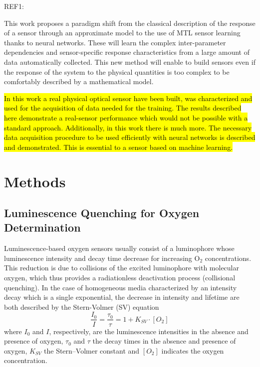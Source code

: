 \documentclass[final,5p,times,twocolumn]{elsarticle}
\begin{document}
REF1: \cite{Michelucci2019_2}

This work proposes a paradigm shift from the classical description of the response of a sensor through an approximate model to the use of MTL sensor learning thanks to neural networks. 
These will learn the complex inter-parameter dependencies and sensor-specific response characteristics from a large amount of data automatically collected. This new method will enable to build sensors even if the response of the system to the physical quantities is too complex to be comfortably described by a mathematical model.

\hl{In this work a real physical optical sensor have been built, was characterized and used for the acquisition of data needed for the training. The results described here demonstrate a real-sensor performance which would not be possible with a standard approach. Additionally, in this work there is much more. The necessary data acquisition procedure to be used efficiently with neural networks is described and demonstrated. This is essential to a sensor based on machine learning.
}

\section{Methods}
\label{sec:methods}

\subsection{Luminescence Quenching for Oxygen Determination}
\label{Theory}

Luminescence-based oxygen sensors usually consist of a luminophore whose luminescence intensity and decay time decrease for increasing O$_2$ concentrations. This reduction is due to collisions of the excited luminophore with molecular oxygen, which thus provides a radiationless deactivation process (collisional quenching). 
In the case of homogeneous media characterized by an intensity decay which is a single exponential, the decrease in intensity and lifetime are both described by the Stern-Volmer (SV) equation \cite{Lakowicz2006}
\begin{equation}
\frac{I_0}{I}=\frac{\tau_0}{\tau}=1+K_{SV} \cdot \left[O_2\right]
\label{SVe}
\end{equation}
where $I_0$ and $I$, respectively, are the luminescence intensities in the absence and presence of oxygen, $\tau_0$ and $\tau$ the decay times in the absence and presence of oxygen, $K_{SV}$ the Stern–Volmer constant and $\left[O_2\right]$ indicates the oxygen concentration.
\end{document}
